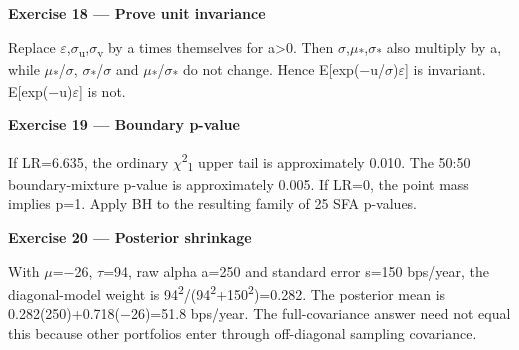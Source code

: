 \textbf{Exercise 18 --- Prove unit invariance}

Replace \ensuremath{\varepsilon },\ensuremath{\sigma }\textsubscript{u},\ensuremath{\sigma }\textsubscript{v} by a times themselves
for a\textgreater0. Then \ensuremath{\sigma },\ensuremath{\mu }\textsubscript{*},\ensuremath{\sigma }\textsubscript{*} also
multiply by a, while \ensuremath{\mu }\textsubscript{*}/\ensuremath{\sigma }, \ensuremath{\sigma }\textsubscript{*}/\ensuremath{\sigma } and
\ensuremath{\mu }\textsubscript{*}/\ensuremath{\sigma }\textsubscript{*} do not change. Hence
E{[}exp(\ensuremath{-}u/\ensuremath{\sigma })\textbar \ensuremath{\varepsilon }{]} is invariant. E{[}exp(\ensuremath{-}u)\textbar \ensuremath{\varepsilon }{]} is
not.

\textbf{Exercise 19 --- Boundary p-value}

If LR=6.635, the ordinary \ensuremath{\chi }\textsuperscript{2}\textsubscript{1} upper tail is
approximately 0.010. The 50:50 boundary-mixture p-value is approximately
0.005. If LR=0, the point mass implies p=1. Apply BH to the resulting
family of 25 SFA p-values.

\textbf{Exercise 20 --- Posterior shrinkage}

With \ensuremath{\mu }=\ensuremath{-}26, \ensuremath{\tau }=94, raw alpha a=250 and standard error s=150 bps/year, the
diagonal-model weight is 94\textsuperscript{2}/(94\textsuperscript{2}+150\textsuperscript{2})=0.282. The posterior mean is
0.282(250)+0.718(\ensuremath{-}26)=51.8 bps/year. The full-covariance answer need not
equal this because other portfolios enter through off-diagonal sampling
covariance.

